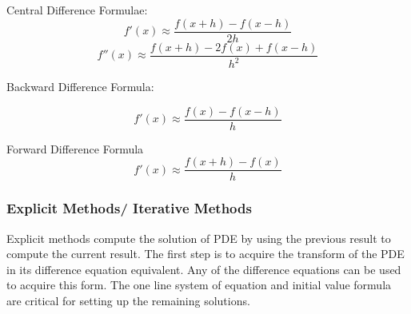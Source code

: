 Central Difference Formulae:
\[
f'(x) \approx \frac{f(x+h) - f(x-h)}{2h} 
\]
\[
f''(x) \approx \frac {f(x+h) -2f(x)+ f(x-h)}{h^2}
\]

Backward Difference Formula: 

\[f'(x) \approx \frac{f(x) - f(x-h)}{h} \]

Forward Difference Formula
\[f'(x) \approx \frac{f(x+h) - f(x)}{h} \]


\subsubsection {Explicit Methods/ Iterative Methods}
Explicit methods compute the solution of PDE by using the previous result to compute the current result.  The first step is to  %
acquire %
the transform of the PDE %
in  its difference equation equivalent.   Any of the difference equations can be used to acquire this form.  %
The one line system of equation and initial value formula are critical for setting up the remaining solutions. %



